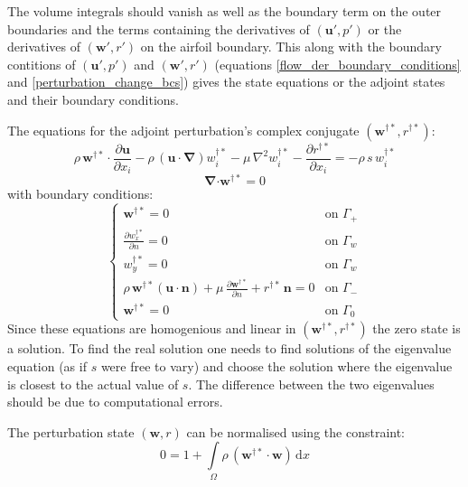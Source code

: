 \documentclass[12pt, a4paper]{article}
\begin{document}
    The volume integrals should vanish as well as the boundary term on the outer boundaries and the terms containing the derivatives of $(\mathbf{u'}, p')$ or the derivatives of $(\mathbf{w'}, r')$ on the airfoil boundary. This along with the boundary contitions of $(\mathbf{u'}, p')$ and $(\mathbf{w'}, r')$ (equations \ref{flow_der_boundary_conditions} and \ref{perturbation_change_bcs}) gives the state equations or the adjoint states and their boundary conditions.
    
    The equations for the adjoint perturbation's complex conjugate $(\mathbf{w^{\dagger*}}, r^{\dagger*})$:
    \begin{equation}
        \rho \, \mathbf{w^{\dagger*} \cdot} \frac{\partial \mathbf{u}}{\partial x_i} - 
        \rho \, (\mathbf{u \cdot} \boldsymbol{\nabla}) w^{\dagger*}_i - 
        \mu \, \nabla^2 w^{\dagger*}_i - 
        \frac{\partial r^{\dagger*}}{\partial x_i} = 
        -\rho \, s \, w^{\dagger*}_i
    \end{equation}
    \begin{equation}
        \boldsymbol{\nabla} \mathbf{\cdot w^{\dagger*}} = 0
    \end{equation}
    with boundary conditions:
    \begin{equation}
    \begin{cases}
        \mathbf{w^{\dagger*}} = 0 & \text{on } \Gamma_+ \\
        \frac{\partial w^{\dagger*}_x}{\partial n} = 0 & \text{on } \Gamma_w \\
        w^{\dagger*}_y = 0 & \text{on } \Gamma_w \\
        \rho \, \mathbf{w^{\dagger*}} (\mathbf{u \cdot n}) + \mu \, \frac{\partial \mathbf{w^{\dagger*}}}{\partial n} + 
        r^{\dagger*} \, \mathbf{n} = 0 & \text{on } \Gamma_- \\
        \mathbf{w^{\dagger*}} = 0 & \text{on } \Gamma_0
    \end{cases}
    \end{equation}
    Since these equations are homogenious and linear in $(\mathbf{w^{\dagger*}}, r^{\dagger*})$ the zero state is a solution. To find the real solution one needs to find solutions of the eigenvalue equation (as if $s$ were free to vary) and choose the solution where the eigenvalue is closest to the actual value of $s$. The difference between the two eigenvalues should be due to computational errors.
    
    The perturbation state $(\mathbf{w}, r)$ can be normalised using the constraint:
    \begin{equation}
        0 = 1 + \int\limits_{\Omega}
            \rho \, (\mathbf{w^{\dagger*} \cdot w})
        \, \mathrm{d} x
    \end{equation}
    
\end{document}
